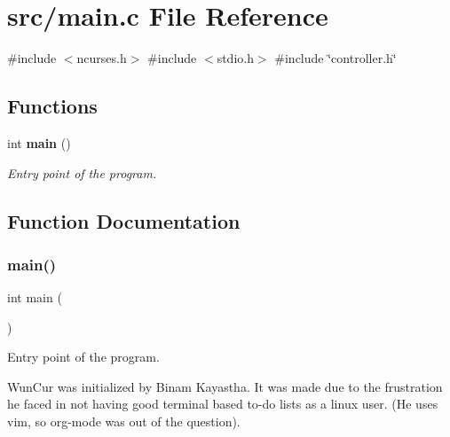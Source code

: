 \section{src/main.c File Reference}
\label{main_8c}
{\ttfamily \#include $<$ncurses.\+h$>$}\newline
{\ttfamily \#include $<$stdio.\+h$>$}\newline
{\ttfamily \#include \char`\"{}controller.\+h\char`\"{}}\newline
\subsection*{Functions}
\begin{DoxyCompactItemize}
\item 
int \textbf{ main} ()
\begin{DoxyCompactList}\small\item\em Entry point of the program. \end{DoxyCompactList}\end{DoxyCompactItemize}


\subsection{Function Documentation}
\mbox{\label{main_8c_ae66f6b31b5ad750f1fe042a706a4e3d4}} 
\subsubsection{main()}
{\footnotesize\ttfamily int main (\begin{DoxyParamCaption}{ }\end{DoxyParamCaption})}



Entry point of the program. 

Wun\+Cur was initialized by Binam Kayastha. It was made due to the frustration he faced in not having good terminal based to-\/do lists as a linux user. (He uses vim, so org-\/mode was out of the question). 